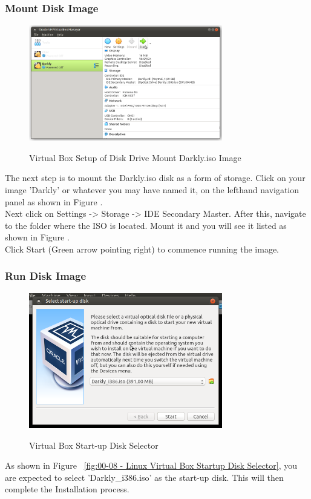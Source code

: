 \subsubsection{Mount Disk Image}
\begin{figure}[!htb]
    \centering
    \includegraphics[width=0.752\textwidth]{images/00-07.png}\\[0cm]  
    \caption[Virtual Box]{Virtual Box Setup of Disk Drive Mount Darkly.iso Image}
    \label{fig:00-07 - Linux Virtual Box ISO Mount} 
\end{figure}
The next step is to mount the Darkly.iso disk as a form of storage. Click on
your image 'Darkly' or whatever you may have named it, on the lefthand navigation
panel as shown in Figure .\\

Next click on Settings -> Storage -> IDE Secondary Master. After this, navigate
to the folder where the ISO is located. Mount it and you will see it listed
as shown in Figure .\\

Click Start (Green arrow pointing right) to commence running the image.

\subsubsection{Run Disk Image}
\begin{figure}[!htb]
    \centering
    \includegraphics[width=0.752\textwidth]{images/00-08.png}\\[0cm]  
    \caption[Virtual Box]{Virtual Box Start-up Disk Selector}
    \label{fig:00-08 - Linux Virtual Box Startup Disk Selector} 
\end{figure}
As shown in Figure ~\vref{fig:00-08 - Linux Virtual Box Startup Disk Selector},
you are expected to select 'Darkly\_i386.iso' as the start-up disk. This will
then complete the Installation process.

